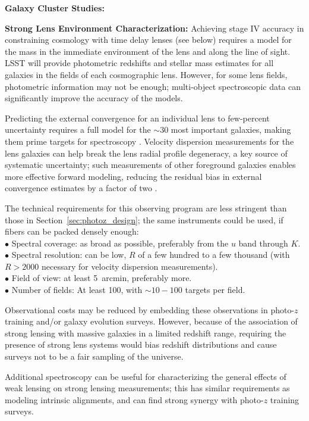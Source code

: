 {\bf Galaxy Cluster Studies:}


{\bf Strong Lens Environment Characterization:}
Achieving stage IV accuracy in constraining cosmology with time delay lenses (see below) requires a
model for the
mass in the immediate environment of the lens and along the line of
sight. LSST will provide photometric
redshifts and stellar mass estimates for all galaxies in the fields of each
cosmographic lens.  
However, for some lens fields,
photometric information may not be enough; multi-object spectroscopic
data can significantly improve the accuracy of the models.

Predicting the external convergence for an individual lens to few-percent uncertainty requires a
full model for the $\sim 30$ most important galaxies, making
them prime targets for spectroscopy \citep{McCullyEtal2016}.  Velocity
dispersion measurements for the lens galaxies can help break the lens radial profile degeneracy, a 
key source of systematic uncertainty; such measurements of other foreground galaxies enables more
effective forward modeling, reducing the residual bias in
external convergence estimates by a factor of two
\citep{CollettEtal2013}.  


The technical requirements for this observing program are
less stringent than those 
in Section~\ref{sec:photoz_design}; the same instruments could be used, if fibers can be packed densely enough:\\  
$\bullet$ Spectral coverage: as broad as possible, preferably from the $u$ band
through $K$.\\
$\bullet$ Spectral resolution: can be low, $R$ of a few hundred to a few
thousand (with $R>2000$ necessary for velocity dispersion measurements).\\
$\bullet$ Field of view: at least 5~arcmin, preferably more.\\
$\bullet$ Number of fields: At least 100, with $\sim10-100$ targets per field.

Observational costs may be reduced by embedding these observations in photo-$z$ 
training and/or galaxy evolution surveys.  However, because of the association of strong lensing
with massive galaxies in a limited redshift range, requiring the presence of strong lens systems
would bias redshift distributions and cause surveys not to be a fair sampling of the universe. 

 Additional spectroscopy can be useful for characterizing the general effects of weak lensing on  strong lensing measurements; this has similar
requirements as modeling intrinsic alignments, and can find strong
synergy with photo-$z$ training surveys.

